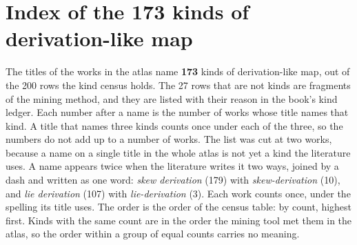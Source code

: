 \chapter*{Index of the \textbf{173} kinds of derivation-like map}\label{page:index-of-kinds}
The titles of the works in the atlas name \textbf{173} kinds of derivation-like map,
out of the 200 rows the kind census holds. The 27 rows that are not kinds are
fragments of the mining method, and they are listed with their reason in the
book's kind ledger.
Each number after a name is the number of works whose title names that kind. A
title that names three kinds counts once under each of the three, so the numbers
do not add up to a number of works.
The list was cut at two works, because a name on a single title in the whole
atlas is not yet a kind the literature uses.
A name appears twice when the literature writes it two ways, joined by a dash and
written as one word: \emph{skew derivation} (179) with \emph{skew-derivation} (10), and
\emph{lie derivation} (107) with \emph{lie-derivation} (3). Each work counts once,
under the spelling its title uses.
The order is the order of the census table: by count, highest first. Kinds with
the same count are in the order the mining tool met them in the atlas, so the
order within a group of equal counts carries no meaning.

